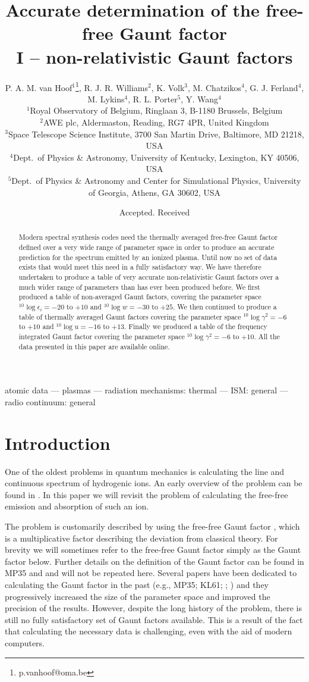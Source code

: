 \documentclass[useAMS,usenatbib]{mn2e}
\title[Accurate determination of the free-free Gaunt factor]{Accurate determination of the free-free Gaunt factor\\I -- non-relativistic Gaunt factors}
\author[P.A.M. van Hoof et al.]
{P. A. M. van Hoof$^1$\thanks{p.vanhoof@oma.be},
R. J. R. Williams$^2$,
K. Volk$^3$,
M. Chatzikos$^4$,
G. J. Ferland$^4$,\newauthor
M. Lykins$^4$,
R. L. Porter$^5$,
Y. Wang$^4$\\
$^1$Royal Observatory of Belgium, Ringlaan 3, B-1180 Brussels, Belgium\\
$^2$AWE plc, Aldermaston, Reading, RG7 4PR, United Kingdom\\
$^3$Space Telescope Science Institute, 3700 San Martin Drive, Baltimore, MD 21218, USA\\
$^4$Dept.\ of Physics \& Astronomy, University of Kentucky, Lexington, KY 40506, USA\\
$^5$Dept.\ of Physics \& Astronomy and Center for Simulational Physics, University of Georgia, Athens, GA 30602, USA
}
\begin{document}
\date{Accepted. Received}

\pagerange{\pageref{firstpage}--\pageref{lastpage}} 

\maketitle

\label{firstpage}

\begin{abstract}
Modern spectral synthesis codes need the thermally averaged free-free Gaunt
factor defined over a very wide range of parameter space in order to produce
an accurate prediction for the spectrum emitted by an ionized plasma. Until
now no set of data exists that would meet this need in a fully satisfactory
way. We have therefore undertaken to produce a table of very accurate
non-relativistic Gaunt factors over a much wider range of parameters than has
ever been produced before. We first produced a table of non-averaged Gaunt
factors, covering the parameter space ${}^{10}\log\epsilon_i = -20$ to $+10$
and ${}^{10}\log w = -30$ to $+25$. We then continued to produce a table of
thermally averaged Gaunt factors covering the parameter space
${}^{10}\log\gamma^2 = -6$ to $+10$ and ${}^{10}\log u = -16$ to $+13$.
Finally we produced a table of the frequency integrated Gaunt factor covering
the parameter space ${}^{10}\log\gamma^2 = -6$ to $+10$. All the data
presented in this paper are available online.
\end{abstract}

\begin{keywords}
atomic data --- plasmas --- radiation mechanisms: thermal --- ISM: general --- radio continuum: general
\end{keywords}

\section{Introduction}

One of the oldest problems in quantum mechanics is calculating the line and
continuous spectrum of hydrogenic ions. An early overview of the problem can
be found in \citet[hereafter MP35]{MP35}. In this paper we will revisit the
problem of calculating the free-free emission and absorption of such an ion.

The problem is customarily described by using the free-free Gaunt factor
\citep{Ga30}, which is a multiplicative factor describing the deviation from
classical theory. For brevity we will sometimes refer to the free-free Gaunt
factor simply as the Gaunt factor below. Further details on the definition of
the Gaunt factor can be found in MP35 and \citet[hereafter KL61]{KL61} and
will not be repeated here. Several papers have been dedicated to calculating
the Gaunt factor in the past (e.g., MP35; KL61; \citealp{Hu88};
\citealp[hereafter S98]{Su98}) and they progressively increased the size of
the parameter space and improved the precision of the results. However,
despite the long history of the problem, there is still no fully satisfactory
set of Gaunt factors available. This is a result of the fact that calculating
the necessary data is challenging, even with the aid of modern computers.
\end{document}
